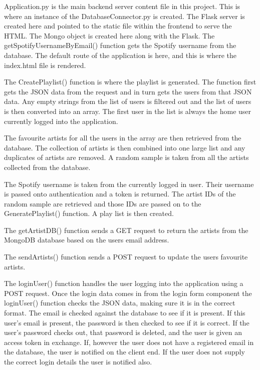 Application.py is the main backend server content file in this project. This is where an instance of the DatabaseConnector.py is created. The Flask server is created here and pointed to the static file within the frontend to serve the HTML. The Mongo object is created here along with the Flask. The getSpotifyUsernameByEmail() function gets the Spotify username from the database. The default route of the application is here, and this is where the index.html file is rendered.

The CreatePlaylist() function is where the playlist is generated. The function first gets the JSON data from the request and in turn gets the users from that JSON data. Any empty strings from the list of users is filtered out and the list of users is then converted into an array. The first user in the list is always the home user currently logged into the application.

The favourite artists for all the users in the array are then retrieved from the database. The collection of artists is then combined into one large list and any duplicates of artists are removed. A random sample is taken from all the artists collected from the database. 

The Spotify username is taken from the currently logged in user. Their username is passed onto authentication and a token is returned. The artist IDs of the random sample are retrieved and those IDs are passed on to the GeneratePlaylist() function. A play list is then created.

The getArtistDB() function sends a GET request to return the artists from the MongoDB database based on the users email address.

The sendArtists() function sends a POST request to update the users favourite artists.

The loginUser() function handles the user logging into the application using a POST request. Once the login data comes in from the login form component the loginUser() function checks the JSON data, making sure it is in the correct format. The email is checked against the database to see if it is present. If this user’s email is present, the password is then checked to see if it is correct.  If the user’s password checks out, that password is deleted, and the user is given an access token in exchange. 
If, however the user does not have a registered email in the database, the user is notified on the client end. If the user does not supply the correct login details the user is notified also.

